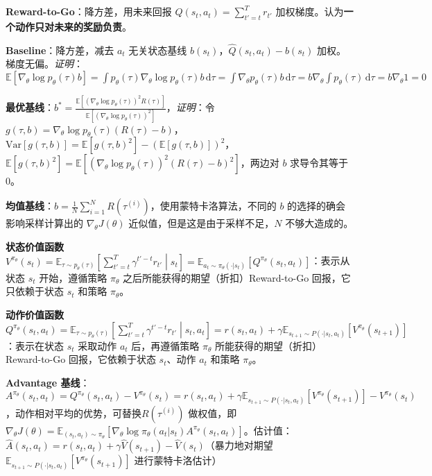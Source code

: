 \documentclass[
  8pt]{extarticle}
\begin{document}
\begin{multicols*}{4}
\textbf{Reward-to-Go}：降方差，用未来回报
\(\hat{Q}(s_t, a_t) = \sum_{t'=t}^{T} r_{t'}\)
加权梯度。认为\textbf{一个动作只对未来的奖励负责}。

\textbf{Baseline}：降方差，减去 \(a_t\) 无关状态基线
\(b(s_t)\)，\(\hat{Q}(s_t, a_t) - b(s_t)\)
加权。梯度无偏。\emph{证明}：\(\mathbb{E}[\nabla_\theta \log p_\theta(\tau) b] = \int p_\theta(\tau) \nabla_\theta \log p_\theta(\tau) b \, \mathrm{d}\tau = \int \nabla_\theta p_\theta(\tau) b \, \mathrm{d}\tau = b \nabla_\theta \int p_\theta(\tau) \, \mathrm{d}\tau = b \nabla_\theta 1 = 0\)

\textbf{最优基线}：\(b^* = \frac{\mathbb{E}[(\nabla_\theta \log p_\theta(\tau))^2 R(\tau)]}{\mathbb{E}[(\nabla_\theta \log p_\theta(\tau))^2]}\)，\emph{证明}：令
\(g(\tau, b) = \nabla_\theta \log p_\theta(\tau) (R(\tau) - b)\)，\(\mathrm{Var}[g(\tau, b)] = \mathbb{E}[g(\tau, b)^2] - (\mathbb{E}[g(\tau, b)])^2\)，\(\mathbb{E}[g(\tau, b)^2] = \mathbb{E}[(\nabla_\theta \log p_\theta(\tau))^2 (R(\tau) - b)^2]\)，两边对
\(b\) 求导令其等于 0。

\textbf{均值基线}：\(b = \frac{1}{N} \sum_{i=1}^N R(\tau^{(i)})\)，使用蒙特卡洛算法，不同的
\(b\) 的选择的确会影响采样计算出的 \(\nabla_\theta J(\theta)\)
近似值，但是这是由于采样不足，\(N\) 不够大造成的。

\textbf{状态价值函数}
\(V^{\pi_\theta}(s_t) = \mathbb{E}_{\tau \sim p_\theta(\tau)} \left[ \sum_{t'=t}^{T} \gamma^{t'-t} r_{t'} \middle| s_t \right] = \mathbb{E}_{a_t \sim \pi_\theta(\cdot|s_t)} [Q^{\pi_\theta}(s_t, a_t)]\)：表示从状态
\(s_t\) 开始，遵循策略 \(\pi_\theta\)
之后所能获得的期望（折扣）Reward-to-Go 回报，它只依赖于状态 \(s_t\)
和策略 \(\pi_\theta\)。

\textbf{动作价值函数}
\(Q^{\pi_\theta}(s_t, a_t) = \mathbb{E}_{\tau \sim p_\theta(\tau)} \left[ \sum_{t'=t}^{T} \gamma^{t'-t} r_{t'} \middle| s_t, a_t \right] = r(s_t, a_t) + \gamma \mathbb{E}_{s_{t+1} \sim P(\cdot|s_t, a_t)} [V^{\pi_\theta}(s_{t+1})]\)：表示在状态
\(s_t\) 采取动作 \(a_t\) 后，再遵循策略 \(\pi_\theta\)
所能获得的期望（折扣）Reward-to-Go 回报，它依赖于状态 \(s_t\)、动作
\(a_t\) 和策略 \(\pi_\theta\)。

\textbf{Advantage
基线}：\(A^{\pi_\theta}(s_t, a_t) = Q^{\pi_\theta}(s_t, a_t) - V^{\pi_\theta}(s_t) = r(s_t, a_t) + \gamma \mathbb{E}_{s_{t+1} \sim P(\cdot|s_t, a_t)} [V^{\pi_\theta}(s_{t+1})] - V^{\pi_\theta}(s_t)\)，动作相对平均的优势，可替换\(R(\tau^{(i)})\)
做权值，即
\(\nabla_\theta J(\theta) = \mathbb{E}_{(s_t, a_t) \sim \pi_\theta} [ \nabla_\theta \log \pi_\theta(a_t | s_t) A^{\pi_\theta}(s_t, a_t) ]\)。估计值：\(\hat{A}(s_t, a_t) = r(s_t, a_t) + \gamma \hat{V}(s_{t+1}) - \hat{V}(s_t)\)（暴力地对期望
\(\mathbb{E}_{s_{t+1} \sim P(\cdot|s_t, a_t)} [V^{\pi_\theta}(s_{t+1})]\)
进行蒙特卡洛估计）


\end{multicols*}
\end{document}
